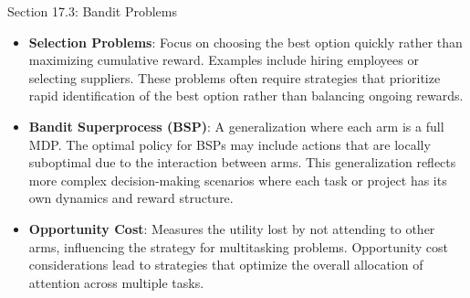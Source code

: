 \begin{notes}{Section 17.3: Bandit Problems}
\begin{highlight}
        \begin{itemize}
            \item \textbf{Selection Problems}: Focus on choosing the best option quickly rather than maximizing cumulative reward. Examples include hiring employees or selecting suppliers. These 
            problems often require strategies that prioritize rapid identification of the best option rather than balancing ongoing rewards.
            \item \textbf{Bandit Superprocess (BSP)}: A generalization where each arm is a full MDP. The optimal policy for BSPs may include actions that are locally suboptimal due to the interaction 
            between arms. This generalization reflects more complex decision-making scenarios where each task or project has its own dynamics and reward structure.
            \item \textbf{Opportunity Cost}: Measures the utility lost by not attending to other arms, influencing the strategy for multitasking problems. Opportunity cost considerations lead to 
            strategies that optimize the overall allocation of attention across multiple tasks.
        \end{itemize}
    
    \end{highlight}
    
    \begin{highlight}
    

\end{highlight}
\end{notes}
